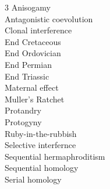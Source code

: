 
\begin{multicols}{3}
Anisogamy \\
Antagonistic coevolution \\
Clonal interference \\
End Cretaceous \\
End Ordovician \\
End Permian \\
End Triassic \\
Maternal effect \\
Muller's Ratchet \\
Protandry \\
Protogyny \\
Ruby-in-the-rubbish \\
Selective interfernce \\
Sequential hermaphroditism \\
Sequential homology \\
Serial homology 
\end{multicols}
